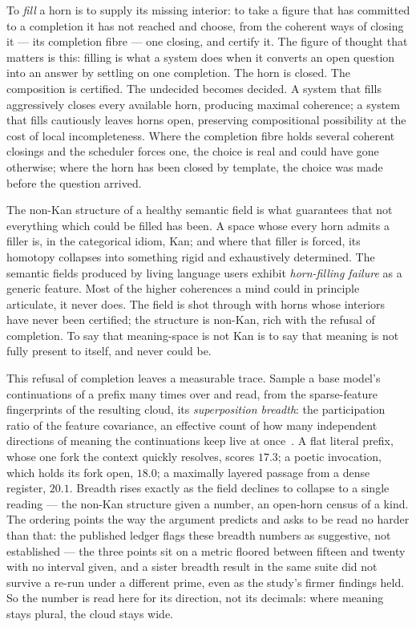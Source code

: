 To \emph{fill} a horn is to supply its missing interior: to take a figure that has committed to a completion it has not reached and choose, from the coherent ways of closing it --- its completion fibre --- one closing, and certify it. The figure of thought that matters is this: filling is what a system does when it converts an open question into an answer by settling on one completion. The horn is closed. The composition is certified. The undecided becomes decided. A system that fills aggressively closes every available horn, producing maximal coherence; a system that fills cautiously leaves horns open, preserving compositional possibility at the cost of local incompleteness. Where the completion fibre holds several coherent closings and the scheduler forces one, the choice is real and could have gone otherwise; where the horn has been closed by template, the choice was made before the question arrived.

The non-Kan structure of a healthy semantic field is what guarantees that not everything which could be filled has been. A space whose every horn admits a filler is, in the categorical idiom, Kan; and where that filler is forced, its homotopy collapses into something rigid and exhaustively determined. The semantic fields produced by living language users exhibit \emph{horn-filling failure} as a generic feature. Most of the higher coherences a mind could in principle articulate, it never does. The field is shot through with horns whose interiors have never been certified; the structure is non-Kan, rich with the refusal of completion. To say that meaning-space is not Kan is to say that meaning is not fully present to itself, and never could be.

This refusal of completion leaves a measurable trace. Sample a base model's continuations of a prefix many times over and read, from the sparse-feature fingerprints of the resulting cloud, its \emph{superposition breadth}: the participation ratio of the feature covariance, an effective count of how many independent directions of meaning the continuations keep live at once~\cite{icra16sensecloud}. A flat literal prefix, whose one fork the context quickly resolves, scores $17.3$; a poetic invocation, which holds its fork open, $18.0$; a maximally layered passage from a dense register, $20.1$. Breadth rises exactly as the field declines to collapse to a single reading --- the non-Kan structure given a number, an open-horn census of a kind. The ordering points the way the argument predicts and asks to be read no harder than that: the published ledger flags these breadth numbers as suggestive, not established --- the three points sit on a metric floored between fifteen and twenty with no interval given, and a sister breadth result in the same suite did not survive a re-run under a different prime, even as the study's firmer findings held. So the number is read here for its direction, not its decimals: where meaning stays plural, the cloud stays wide.

